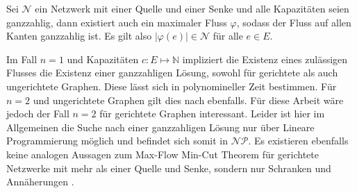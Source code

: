 \begin{theorem}\label{theo_int_flow}
Sei $\mathcal{N}$ ein Netzwerk mit einer Quelle und einer Senke und alle Kapazitäten seien ganzzahlig, dann existiert auch ein maximaler Fluss $\varphi$, sodass der Fluss auf allen Kanten ganzzahlig ist. Es gilt also $|\varphi(e)| \in \mathcal{N}$ für alle $e\in E$.
\end{theorem}

\begin{remark}
Im Fall $n=1$ und Kapazitäten $c:E\mapsto\mathbb{N}$ impliziert die Existenz eines zulässigen Flusses die Existenz einer ganzzahligen Lösung, sowohl für gerichtete als auch ungerichtete Graphen. Diese lässt sich in polynomineller Zeit bestimmen. Für $n=2$ und ungerichtete Graphen gilt dies nach \cite{hu} ebenfalls. Für diese Arbeit wäre jedoch der Fall $n=2$ für gerichtete Graphen interessant. Leider ist hier im Allgemeinen die Suche nach einer ganzzahligen Lösung nur über Lineare Programmierung möglich und befindet sich somit in $\mathcal{NP}$. Es existieren ebenfalls keine analogen Aussagen zum Max-Flow Min-Cut Theorem für gerichtete Netzwerke mit mehr als einer Quelle und Senke, sondern nur Schranken und Annäherungen \cite{leighton99}.
\end{remark}